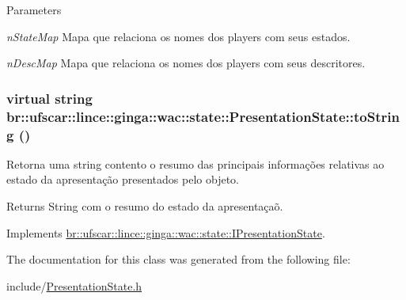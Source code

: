 \begin{DoxyParams}{Parameters}
\item[{\em nStateMap}]Mapa que relaciona os nomes dos players com seus estados. \item[{\em nDescMap}]Mapa que relaciona os nomes dos players com seus descritores. \end{DoxyParams}
\hypertarget{classbr_1_1ufscar_1_1lince_1_1ginga_1_1wac_1_1state_1_1PresentationState_a00ec06809774af254532488cc1559c15}{
\subsubsection[{toString}]{\setlength{\rightskip}{0pt plus 5cm}virtual string br::ufscar::lince::ginga::wac::state::PresentationState::toString ()}}
\label{classbr_1_1ufscar_1_1lince_1_1ginga_1_1wac_1_1state_1_1PresentationState_a00ec06809774af254532488cc1559c15}


Retorna uma string contento o resumo das principais informações relativas ao estado da apresentação presentados pelo objeto. 

\begin{DoxyReturn}{Returns}
String com o resumo do estado da apresentaçaõ. 
\end{DoxyReturn}


Implements \hyperlink{classbr_1_1ufscar_1_1lince_1_1ginga_1_1wac_1_1state_1_1IPresentationState_a148a58eee3e6f96ae226f8360696d944}{br::ufscar::lince::ginga::wac::state::IPresentationState}.



The documentation for this class was generated from the following file:\begin{DoxyCompactItemize}
\item 
include/\hyperlink{PresentationState_8h}{PresentationState.h}\end{DoxyCompactItemize}
